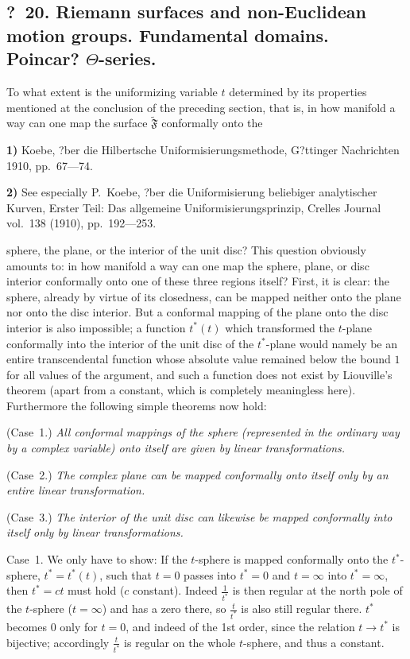 \documentclass{article}
\begin{document}
\subsection*{?~20. Riemann surfaces and non-Euclidean motion groups. Fundamental domains. Poincar? $\Theta$-series.}

To what extent is the uniformizing variable $t$ determined by its properties mentioned at the conclusion of the preceding section, that is, in how manifold a way can one map the surface $\widetilde{\mathfrak{F}}$ conformally onto the

\textbf{1)} Koebe, ?ber die Hilbertsche Uniformisierungsmethode, G?ttinger Nachrichten 1910, pp.~67---74.

\textbf{2)} See especially P.~Koebe, ?ber die Uniformisierung beliebiger analytischer Kurven, Erster Teil: Das allgemeine Uniformisierungsprinzip, Crelles Journal vol.~138 (1910), pp.~192---253.

sphere, the plane, or the interior of the unit disc? This question obviously amounts to: in how manifold a way can one map the sphere, plane, or disc interior conformally onto one of these three regions itself? First, it is clear: the sphere, already by virtue of its closedness, can be mapped neither onto the plane nor onto the disc interior. But a conformal mapping of the plane onto the disc interior is also impossible; a function $t^*(t)$ which transformed the $t$-plane conformally into the interior of the unit disc of the $t^*$-plane would namely be an entire transcendental function whose absolute value remained below the bound $1$ for all values of the argument, and such a function does not exist by Liouville's theorem (apart from a constant, which is completely meaningless here). Furthermore the following simple theorems now hold:

(Case~1.) \emph{All conformal mappings of the sphere (represented in the ordinary way by a complex variable) onto itself are given by linear transformations.}

(Case~2.) \emph{The complex plane can be mapped conformally onto itself only by an entire linear transformation.}

(Case~3.) \emph{The interior of the unit disc can likewise be mapped conformally into itself only by linear transformations.}

Case~1. We only have to show: If the $t$-sphere is mapped conformally onto the $t^*$-sphere, $t^* = t^*(t)$, such that $t = 0$ passes into $t^* = 0$ and $t = \infty$ into $t^* = \infty$, then $t^* = ct$ must hold ($c$ constant). Indeed $\frac{1}{t^*}$ is then regular at the north pole of the $t$-sphere ($t = \infty$) and has a zero there, so $\frac{t}{t^*}$ is also still regular there. $t^*$ becomes $0$ only for $t = 0$, and indeed of the 1st order, since the relation $t \to t^*$ is bijective; accordingly $\frac{t}{t^*}$ is regular on the whole $t$-sphere, and thus a constant.
\end{document}
